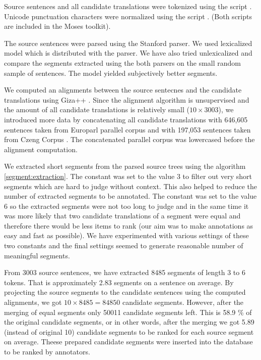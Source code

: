 Source sentences and all candidate translations were tokenized using the script
. Unicode punctuation characters were normalized using
the script . (Both scripts are included
in the Moses toolkit).

The source sentences were parsed using the Stanford parser. We used
lexicalized  model  which is
distributed with the parser. We have also tried unlexicalized 
 and compare the segments extracted using the both parsers
on the small random sample of sentences. The  model yielded
subjectively better segments.

We computed an alignments between the source sentecnes and the candidate
translations using Giza++ . Since the alignment algorithm is
unsupervised and the amount of all candidate translations is relatively small
($10 \times 3003$), we introduced more data by concatenating all candidate
translations with 646,605 sentences taken from Europarl parallel corpus
 and with 197,053 sentences taken from Czeng Corpus
.  The concatenated parallel corpus was lowercased before
the alignment computation. 

We extracted short segments from the parsed source trees using the algorithm
\ref{segment:extraction}. The constant  was set to
the value 3 to filter out very short segments which are hard to judge without
context. This also helped to reduce the number of extracted segments to be
annotated. The constant  was set to the value 6 so
the extracted segments were not too long to judge and in the same time it was
more likely that two candidate translations of a segment were equal and
therefore there would be less items to rank (our aim was to make annotations as
easy and fast as possible). We have experimented with various settings of these
two constants and the final settings seemed to generate reasonable number of
meaningful segments.

From 3003 source sentences, we have extracted 8485 segments of length 3 to 6
tokens. That is approximately 2.83 segments on a sentence on average. By
projecting the source segments to the candidate sentences using the computed
alignments, we got $10 \times 8485 = 84850$ candidate segments. However, after
the merging of equal segments only 50011 candidate segments left. This is 58.9
\% of the original candidate segments, or in other words, after the merging we
got 5.89 (instead of original 10) candidate segments to be ranked for each
source segment on average. Theese prepared candidate segments were inserted
into the database to be ranked by annotators.

